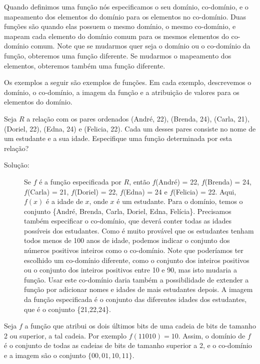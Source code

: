 Quando definimos uma função nós especificamos o seu domínio, co-domínio, e o
mapeamento dos elementos do domínio para os elementos no co-domínio. Duas
funções são  quando elas possuem o mesmo domínio, o mesmo
co-domínio, e mapeam cada elemento do domínio comum para os mesmos elementos do
co-domínio comum. Note que se mudarmos quer seja o domínio ou o co-domínio da
função, obteremos uma função diferente. Se mudarmos o mapeamento dos elementos,
obteremos também uma função diferente.

Os exemplos a seguir são exemplos de funções. Em cada exemplo, descrevemos o
domínio, o co-domínio, a imagem da função e a atribuição de valores para os
elementos do domínio.

\begin{exmp}
\label{exem323}
Seja $R$ a relação com os pares ordenados (André, 22), (Brenda, 24), (Carla,
21), (Doriel, 22), (Edna, 24) e (Felicia, 22). Cada um desses pares consiste no
nome de um estudante e a sua idade. Especifique uma função determinada por esta
relação?
\begin{description}
\item[Solução:]Se $f$ é a função especificada por $R$, então $f$(André) = 22,
$f$(Brenda) = 24, $f$(Carla) = 21, $f$(Doriel) = 22, $f$(Edna) = 24 e
$f$(Felicia) = 22. Aqui, $f(x)$ é a idade de $x$, onde $x$ é um estudante. Para
o domínio, temos o conjunto \{André, Brenda, Carla, Doriel, Edna, Felícia\}.
Precisamos também especificar o co-domínio, que deverá conter todas as idades
possíveis dos estudantes. Como é muito provável que os estudantes tenham todos
menos de 100 anos de idade, podemos indicar o conjunto dos números positivos
inteiros como o co-domínio. Note que poderíamos ter escolhido um co-domínio
diferente, como o conjunto dos inteiros positivos ou o conjunto dos inteiros
positivos entre 10 e 90, mas isto mudaria a função. Usar este co-domínio daria
também a possibilidade de extender a função por adicionar nomes e idades de mais
estudantes depois. A imagem da função especificada é o conjunto das diferentes
idades dos estudantes, que é o conjunto \{21,22,24\}.
\end{description}
\end{exmp}

\begin{exmp}
\label{exem324}
Seja $f$ a função que atribui os dois últimos bits de uma cadeia de bits de
tamanho 2 ou superior, a tal cadeia. Por exemplo $f(11010) = 10$. Assim, o
domínio de $f$ é o conjunto de todas as cadeias de bits de tamanho superior a 2,
e o co-domínio e a imagem são o conjunto $\{00,01,10,11\}$.
\end{exmp}

